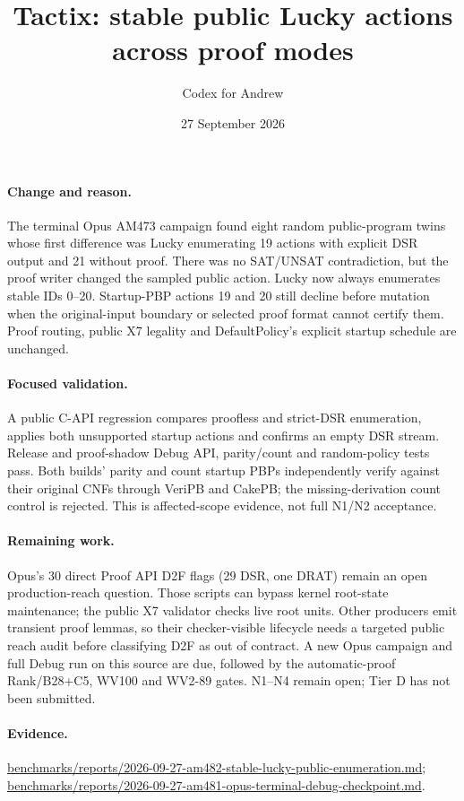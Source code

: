 \documentclass[11pt]{article}
\title{Tactix: stable public Lucky actions across proof modes}
\author{Codex for Andrew}
\date{27 September 2026}
\begin{document}
\maketitle

\paragraph{Change and reason.}
The terminal Opus AM473 campaign found eight random public-program twins whose
first difference was Lucky enumerating 19 actions with explicit DSR output and
21 without proof. There was no SAT/UNSAT contradiction, but the proof writer
changed the sampled public action. Lucky now always enumerates stable IDs
0--20. Startup-PBP actions 19 and 20 still decline before mutation when the
original-input boundary or selected proof format cannot certify them. Proof
routing, public X7 legality and DefaultPolicy's explicit startup schedule are
unchanged.

\paragraph{Focused validation.}
A public C-API regression compares proofless and strict-DSR enumeration,
applies both unsupported startup actions and confirms an empty DSR stream.
Release and proof-shadow Debug API, parity/count and random-policy tests pass.
Both builds' parity and count startup PBPs independently verify against their
original CNFs through VeriPB and CakePB; the missing-derivation count control
is rejected. This is affected-scope evidence, not full N1/N2 acceptance.

\paragraph{Remaining work.}
Opus's 30 direct Proof API D2F flags (29 DSR, one DRAT) remain an open
production-reach question. Those scripts can bypass kernel root-state
maintenance; the public X7 validator checks live root units. Other producers
emit transient proof lemmas, so their checker-visible lifecycle needs a
targeted public reach audit before classifying D2F as out of contract. A new
Opus campaign and full Debug run on this source are due, followed by the
automatic-proof Rank/B28+C5, WV100 and WV2-89 gates. N1--N4 remain open; Tier
D has not been submitted.

\paragraph{Evidence.}
\url{benchmarks/reports/2026-09-27-am482-stable-lucky-public-enumeration.md};
\url{benchmarks/reports/2026-09-27-am481-opus-terminal-debug-checkpoint.md}.
\end{document}
